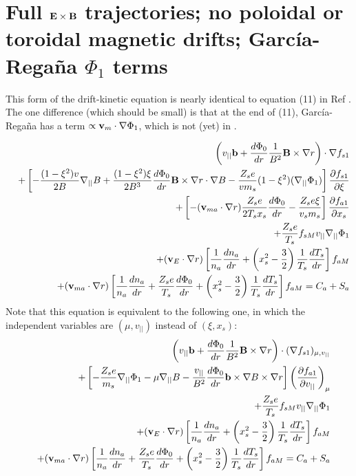\section{Full ${\mathbf E}\times{\mathbf B}$ trajectories; no poloidal or toroidal magnetic drifts; Garc\'{i}a-Rega\~{n}a $\Phi_1$ terms}

This form of the drift-kinetic equation is nearly identical to equation (11) in Ref \cite{Regana2013}.
The one difference (which should be small) is that at the end of (11), Garc\'{i}a-Rega\~{n}a
has a term $\propto {\mathbf v}_m \cdot \nabla \Phi_1$, which is not (yet) in \sfincs.

\begin{eqnarray}
&&\left(v_{||}{\mathbf b} + \frac{d\Phi_0}{dr} \frac{1}{B^2} {\mathbf B}\times\nabla r \right) \cdot \nabla f_{s1} \\
&&+ \left[ - \frac{(1-\xi^2)v}{2B} \nabla_{||} B
+\frac{(1-\xi^2)\xi}{2B^3} \frac{d\Phi_0}{dr}{\mathbf B}\times\nabla r\cdot\nabla B 
-\frac{Z_s e}{v m_s}(1-\xi^2)(\nabla_{||}\Phi_1)
\right]
 \frac{\partial f_{s1}}{\partial \xi} \nonumber \\
&&+ \left[
-({\mathbf v}_{ma} \cdot\nabla r) \frac{Z_s e}{2 T_s x_s} \frac{d\Phi_0}{dr} 
-\frac{Z_s e \xi}{v_s m_s}
\right] \frac{\partial f_{a1}}{\partial x_s} \nonumber \\
&&+\frac{Z_s e}{T_s} f_{sM} v_{||} \nabla_{||} \Phi_1 \nonumber \\
&& + ({\mathbf v}_E \cdot \nabla r) \left[ \frac{1}{n_a} \frac{dn_a}{dr}  + \left(x_s^2-\frac{3}{2}\right) \frac{1}{T_s} \frac{dT_s}{dr}\right] f_{aM} \nonumber \\
&&+ ({\mathbf v}_{ma} \cdot \nabla r) \left[ \frac{1}{n_a} \frac{dn_a}{dr} + \frac{Z_s e}{T_s} \frac{d\Phi_0}{dr} + \left(x_s^2-\frac{3}{2}\right) \frac{1}{T_s} \frac{dT_s}{dr}\right] f_{aM}
 = C_a + S_a \nonumber
\end{eqnarray}
Note that this equation is equivalent to the following one, in which the independent variables
are $(\mu,v_{||})$ instead of $(\xi,x_s)$:
\begin{eqnarray}
&&\left(v_{||}{\mathbf b} + \frac{d\Phi_0}{dr} \frac{1}{B^2} {\mathbf B}\times\nabla r \right) \cdot (\nabla f_{s1})_{\mu, v_{||}} \\
&&+ \left[ -\frac{Z_s e}{m_s} \nabla_{||} \Phi_1
- \mu \nabla_{||} B
-\frac{v_{||}}{B^2} \frac{d\Phi_0}{dr} {\mathbf b}\times\nabla B \times \nabla r \right]
\left( \frac{\partial f_{a1}}{\partial v_{||}} \right)_{\mu} \nonumber \\
&&+\frac{Z_s e}{T_s} f_{sM} v_{||} \nabla_{||} \Phi_1 \nonumber \\
&& + ({\mathbf v}_E \cdot \nabla r) \left[ \frac{1}{n_a} \frac{dn_a}{dr}  + \left(x_s^2-\frac{3}{2}\right) \frac{1}{T_s} \frac{dT_s}{dr}\right] f_{aM} \nonumber \\
&& + ({\mathbf v}_{ma} \cdot \nabla r) \left[ \frac{1}{n_a} \frac{dn_a}{dr} + \frac{Z_s e}{T_s} \frac{d\Phi_0}{dr} + \left(x_s^2-\frac{3}{2}\right) \frac{1}{T_s} \frac{dT_s}{dr}\right] f_{aM}
=C_a + S_a \nonumber
\end{eqnarray}
